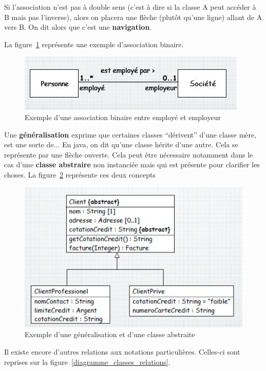 Si l'association n'est pas à double sens
(c'est à dire si la classe A peut accéder à B mais pas l'inverse),
alors on placera une flèche (plutôt qu'une ligne) allant de A vers B.
On dit alors que c'est une \textbf{navigation}.

La figure~\ref{diagramme_classes_association}
représente une exemple d'association binaire.
\begin{figure}[h]
  \centering
  \includegraphics[scale=1]{diagramme_classes_association.jpg}
  \caption{Exemple d'une association binaire entre employé et employeur}
  \label{diagramme_classes_association}
\end{figure}

Une \textbf{généralisation} exprime que certaines classes
``dérivent'' d'une classe mère,
est une sorte de...
En java, on dit qu'une classe hérite d'une autre.
Cela se représente par une flèche ouverte.
Cela peut être nécessaire notamment dans le cas d'une
\textbf{classe abstraire} non instanciée mais qui
est présente pour clarifier les choses.
La figure~\ref{diagramme_classes_generalisation} représente ces deux concepts
\begin{figure}[h]
  \centering
  \includegraphics[scale=0.8]{diagramme_classes_generalisation}
  \caption{Exemple d'une généralisation et d'une classe abstraite}
  \label{diagramme_classes_generalisation}
\end{figure}

Il existe encore d'autres relations aux notations particulières.
Celles-ci sont reprises sur la figure~\ref{diagramme_classes_relations}.


